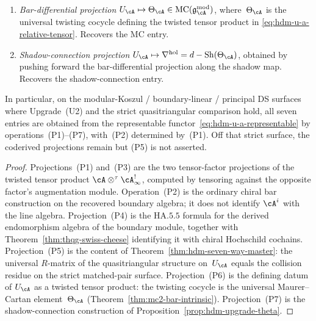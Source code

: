 \begin{corollary}
\begin{enumerate}[label=\textup{(P\arabic*)}]
 binary collision stratum, produces~$r_\cA(z)$. Recovers the residue
 entry; this is exactly Theorem~\ref{thm:hdm-seven-way-master}.
\item \emph{Bar-differential projection} $U_\cA \mapsto \Theta_\cA \in
 \mathrm{MC}(\mathfrak g^{\mathrm{mod}}_\cA)$, where~$\Theta_\cA$ is
 the universal twisting cocycle defining the twisted tensor product in
\eqref{eq:hdm-u-a-relative-tensor}. Recovers the MC entry.
\item \emph{Shadow-connection projection} $U_\cA \mapsto
 \nabla^{\mathrm{hol}} = d - \mathrm{Sh}(\Theta_\cA)$, obtained by
 pushing forward the bar-differential projection along the shadow map.
 Recovers the shadow-connection entry.
\end{enumerate}
In particular, on the modular-Koszul / boundary-linear / principal DS
surfaces where Upgrade~\textup{(U2)} and the strict quasitriangular
comparison hold, all seven entries are obtained from the representable
functor~\eqref{eq:hdm-u-a-representable} by
operations~\textup{(P1)}--\textup{(P7)}, with~\textup{(P2)}
determined by~\textup{(P1)}. Off that strict surface, the coderived
projections remain but \textup{(P5)} is not asserted.
\end{corollary}

\begin{proof}
Projections~\textup{(P1)} and~\textup{(P3)} are the two tensor-factor
projections of the twisted tensor product
$\cA \otimes^\tau \cA^{!}_\infty$, computed by tensoring against the
opposite factor's augmentation module. Operation~\textup{(P2)} is the
ordinary chiral bar construction on the recovered boundary algebra; it
does not identify $\cA^i$ with the line algebra. Projection~\textup{(P4)} is
the $\mathrm{HA}.5.5$ formula for the derived endomorphism algebra of
the boundary module, together with
Theorem~\ref{thm:thqg-swiss-cheese} identifying it with chiral
Hochschild cochains. Projection~\textup{(P5)} is the content of
Theorem~\ref{thm:hdm-seven-way-master}: the universal $R$-matrix of
the quasitriangular structure on~$U_\cA$ equals the collision
residue on the strict matched-pair surface. Projection~\textup{(P6)}
is the defining datum of
$U_\cA$ as a twisted tensor product: the twisting cocycle is the
universal Maurer--Cartan element~$\Theta_\cA$
(Theorem~\ref{thm:mc2-bar-intrinsic}). Projection~\textup{(P7)} is
the shadow-connection construction of
Proposition~\ref{prop:hdm-upgrade-theta}.
\end{proof}

